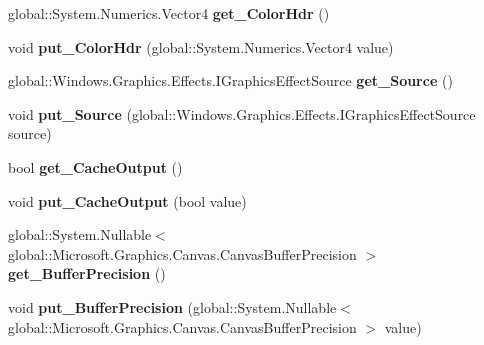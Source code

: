 \begin{DoxyCompactItemize}
global\+::\+System.\+Numerics.\+Vector4 {\bfseries get\+\_\+\+Color\+Hdr} ()
\item 
\mbox{\label{class_microsoft_1_1_graphics_1_1_canvas_1_1_effects_1_1_tint_effect_a755aa3dff5affa0462452b38f7531724}} 
void {\bfseries put\+\_\+\+Color\+Hdr} (global\+::\+System.\+Numerics.\+Vector4 value)
\item 
\mbox{\label{class_microsoft_1_1_graphics_1_1_canvas_1_1_effects_1_1_tint_effect_a9267620729e4a6ac5fc2630f76778386}} 
global\+::\+Windows.\+Graphics.\+Effects.\+I\+Graphics\+Effect\+Source {\bfseries get\+\_\+\+Source} ()
\item 
\mbox{\label{class_microsoft_1_1_graphics_1_1_canvas_1_1_effects_1_1_tint_effect_ac66aa06889ca0cbf9ff5c94ee93cdb05}} 
void {\bfseries put\+\_\+\+Source} (global\+::\+Windows.\+Graphics.\+Effects.\+I\+Graphics\+Effect\+Source source)
\item 
\mbox{\label{class_microsoft_1_1_graphics_1_1_canvas_1_1_effects_1_1_tint_effect_a8a4e01e4d6f2faae14d07ee09789a842}} 
bool {\bfseries get\+\_\+\+Cache\+Output} ()
\item 
\mbox{\label{class_microsoft_1_1_graphics_1_1_canvas_1_1_effects_1_1_tint_effect_a44c3eb5fa1e48b9cdeb575b67f876534}} 
void {\bfseries put\+\_\+\+Cache\+Output} (bool value)
\item 
\mbox{\label{class_microsoft_1_1_graphics_1_1_canvas_1_1_effects_1_1_tint_effect_a00913811e138e52f30099d4b0097286c}} 
global\+::\+System.\+Nullable$<$ global\+::\+Microsoft.\+Graphics.\+Canvas.\+Canvas\+Buffer\+Precision $>$ {\bfseries get\+\_\+\+Buffer\+Precision} ()
\item 
\mbox{\label{class_microsoft_1_1_graphics_1_1_canvas_1_1_effects_1_1_tint_effect_a4a1c422bc431af6896099f31f2938778}} 
void {\bfseries put\+\_\+\+Buffer\+Precision} (global\+::\+System.\+Nullable$<$ global\+::\+Microsoft.\+Graphics.\+Canvas.\+Canvas\+Buffer\+Precision $>$ value)

\end{DoxyCompactItemize}
